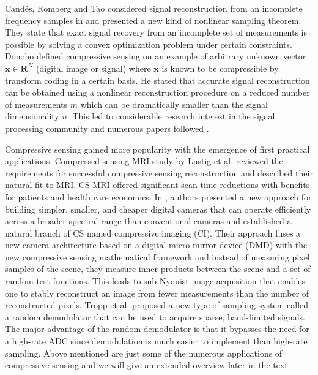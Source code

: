 \documentclass[journal]{IEEEtran}
\begin{document}
Cand\'es, Romberg and Tao considered signal reconstruction from an incomplete frequency samples in \cite{Candes2006} and presented a new kind of nonlinear sampling theorem. They state that exact signal recovery from an incomplete set of measurements is possible by solving a convex optimization problem under certain constraints. Donoho \cite{Donoho2006} defined compressive sensing on an example of arbitrary unknown vector $\boldsymbol{x} \in \mathbf{R}^N$ (digital image or signal) where $\boldsymbol{x}$ is known to be compressible by transform coding in a certain basis. He stated that accurate signal reconstruction can be obtained using a nonlinear reconstruction procedure on a reduced number of measurements $m$ which can be dramatically smaller than the signal dimensionality $n$. This led to considerable research interest in the signal processing community and numerous papers followed \cite{Candes2006_2, Candes2007, Baraniuk2007, Candes2008}.

Compressive sensing gained more popularity with the emergence of first practical applications. Compressed sensing MRI study by Lustig et al. \cite{Lustig2008} reviewed the requirements for successful compressive sensing reconstruction and described their natural fit to MRI. CS-MRI offered significant scan time reductions with benefits for patients and health care economics. In \cite{duarte2008single}, authors presented a new approach for building simpler, smaller, and cheaper digital cameras that can operate efficiently across a broader spectral range than conventional cameras and established a natural branch of CS named compressive imaging (CI). Their approach fuses a new camera architecture based on a digital micro-mirror device (DMD) with the new compressive sensing mathematical framework and instead of measuring pixel samples of the scene, they measure inner products between the scene and a set of random test functions. This leads to sub-Nyquist image acquisition that enables one to stably reconstruct an image from fewer measurements than the number of reconstructed pixels. Tropp et al. \cite{Tropp2010} proposed a new type of sampling system called a random demodulator that can be used to acquire sparse, band-limited signals. The major advantage of the random demodulator is that it bypasses the need for a high-rate ADC since demodulation is much easier to implement than high-rate sampling. Above mentioned are just some of the numerous applications of compressive sensing and we will give an extended overview later in the text.
\end{document}
